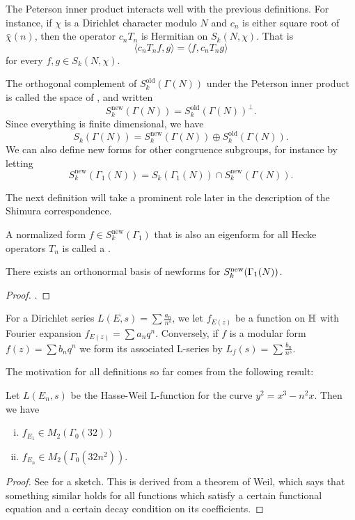 \documentclass[12pt, a4paper]{report}
\begin{document}
The Peterson inner product interacts well with the previous definitions. For
instance, if $\chi$ is a Dirichlet character modulo $N$ and $c_n$ is either
square root of $\bar{\chi}(n)$, then the operator $c_n T_n$ is Hermitian on
$S_k(N, \chi)$. That
is
\[\langle c_n T_n f, g \rangle = \langle f, c_n T_n g \rangle\]
for every $f, g \in S_k(N,\chi).$

\begin{defn}
  The orthogonal complement of $S_k^{\text{old}}(\Gamma(N))$ under the Peterson
  inner product is called the space of , and
  written
  \[S_k^{\text{new}}(\Gamma(N)) = S_k^{\text{old}}(\Gamma(N))^\perp.\]
  Since everything is finite dimensional, we have
  \[S_k(\Gamma(N)) = S_k^{\text{new}}(\Gamma(N)) \oplus S_k^{\text{old}}(\Gamma(N)).\]
  We can also define new forms for other congruence subgroups, for instance by
  letting
  \[S_k^{\text{new}}(\Gamma_1(N)) = S_k(\Gamma_1(N)) \cap
  S_k^{\text{new}}(\Gamma(N)).\]
\end{defn}

The next definition will take a prominent role later in the description of the
Shimura correspondence.

\begin{defn}
  A normalized form $f \in S_k^{\text{new}}(\Gamma_1)$ that is also an eigenform for all
  Hecke operators $T_n$ is called a . 
\end{defn}

\newpage

\begin{prop}
  There exists an orthonormal basis of newforms for $S_k^{\textnormal{new}}(\Gamma_1(N))$.
\end{prop}
\begin{proof}
  \cite[See][Theorem 3.1, Pages 125-137]{lang}.
\end{proof}

For a Dirichlet series $L(E, s) = \sum \frac{a_n}{n^s}$, we let $f_{E(z)}$ be a
function on $\mathbb{H}$ with Fourier expansion $f_{E(z)} = \sum a_n q^n.$ Conversely,
if $f$ is a modular form $f(z) = \sum b_n q^n$ we form its associated L-series
by $L_f(s) = \sum \frac{b_n}{n^s}.$

The motivation for all definitions so far comes from the following result:

\begin{prop} \label{Llevel}
  Let $L(E_n,s)$ be the Hasse-Weil L-function for the curve $y^2 = x^3-n^2x$.
  Then we have
  \begin{enumerate}[(i)]
  \item $f_{E_1} \in M_2(\Gamma_0(32))$
  \item $f_{E_n} \in M_2(\Gamma_0(32n^2))$.
  \end{enumerate}
\end{prop}
\begin{proof}
  See \cite[Pages 140-143]{koblitz} for a sketch. This is derived from a theorem
  of Weil, which says that something similar holds for all functions which satisfy
  a certain functional equation and a certain decay condition on its
  coefficients.
\end{proof}
\end{document}
